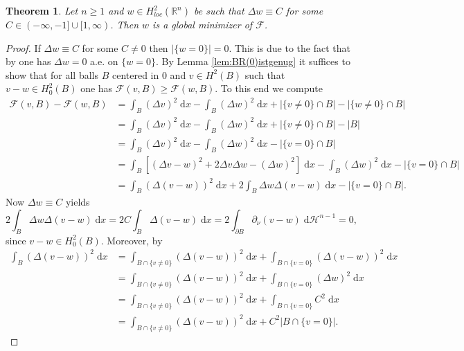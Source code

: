 \documentclass[twoside,11pt]{article}
\newtheorem{theorem}{Theorem}
\theoremstyle{definition}
\begin{document}
\begin{theorem}\label{lem:globmin}
    Let $n \geq 1$ and $w \in H^2_{loc}(\mathbb{R}^n)$ be such that $\Delta w \equiv C$ for some $C \in (-\infty,-1] \cup [1, \infty)$. Then $w$ is a global minimizer of $\mathcal{F}$. 
\end{theorem}
\begin{proof} 
If $\Delta w \equiv C$ for some $C \neq 0$ then $|\{ w = 0 \}| = 0$. This is due to the fact that by \cite[Lemma 4]{GMMathAnn} one has $\Delta w = 0$ a.e. on $\{ w = 0 \}.$
By Lemma \ref{lem:BR(0)istgenug} it suffices to show that for all balls $B$ centered in $0$ and $v \in H^2(B)$ such that $v-w \in H_0^2(B)$ one has $\mathcal{F}(v,B) \geq \mathcal{F}(w,B)$. To this end we compute 
    \begin{align}
        \mathcal{F}(v,B)- \mathcal{F}(w,B)  & = \int_B(\Delta v)^2 \; \mathrm{d}x - \int_B (\Delta w)^2 \; \mathrm{d}x + |\{ v \neq 0 \} \cap B|  - |\{ w \neq 0 \} \cap B|  \nonumber
        \\ & = \int_B(\Delta v)^2 \; \mathrm{d}x - \int_B (\Delta w)^2 \; \mathrm{d}x + |\{ v \neq 0 \} \cap B|  - |B|  \nonumber
        \\ & = \int_B(\Delta v)^2 \; \mathrm{d}x - \int_B (\Delta w)^2 \; \mathrm{d}x - |\{ v = 0 \} \cap B|  \nonumber
        \\ & = \int_B [(\Delta v-w)^2 + 2\Delta v \Delta w - (\Delta w)^2] \; \mathrm{d}x - \int_B (\Delta w)^2 \; \mathrm{d}x - |\{ v = 0 \} \cap B| \nonumber
        \\ & = \int_B (\Delta (v-w))^2 \; \mathrm{d}x + 2 \int_B \Delta w \Delta(v-w) \; \mathrm{d}x - |\{ v = 0 \} \cap B|. \label{eq:40A}
     \end{align}
     Now $\Delta w \equiv C$ yields
     \begin{equation*}
         2 \int_B \Delta w \Delta(v-w) \; \mathrm{d}x = 2C \int_B \Delta (v-w) \; \mathrm{d}x = 2 \int_{\partial B} \partial_\nu (v-w) \; \mathrm{d}\mathcal{H}^{n-1} = 0,
     \end{equation*}
     since $v-w \in H_0^2(B).$ Moreover, by \cite[Lemma 4]{GMMathAnn}
     \begin{align*}
         \int_B (\Delta (v-w))^2 \; \mathrm{d}x &  = \int_{B \cap \{ v\neq 0 \}}  (\Delta (v-w))^2 \; \mathrm{d}x  + \int_{B \cap \{ v= 0 \}}  (\Delta (v-w))^2 \; \mathrm{d}x \\ & =  \int_{B \cap \{ v\neq 0 \}}  (\Delta (v-w))^2 \; \mathrm{d}x  + \int_{B \cap \{ v= 0 \}}  (\Delta w)^2 \; \mathrm{d}x  
         \\ &= \int_{B \cap \{ v\neq 0 \}}  (\Delta (v-w))^2 \; \mathrm{d}x  + \int_{B \cap \{ v= 0 \}}  C^2 \; \mathrm{d}x \\ &  = \int_{B \cap \{ v\neq 0 \}}  (\Delta (v-w))^2 \; \mathrm{d}x  + C^2|B \cap \{ v = 0 \} |. 

\end{align*}
\end{proof}
\end{document}
